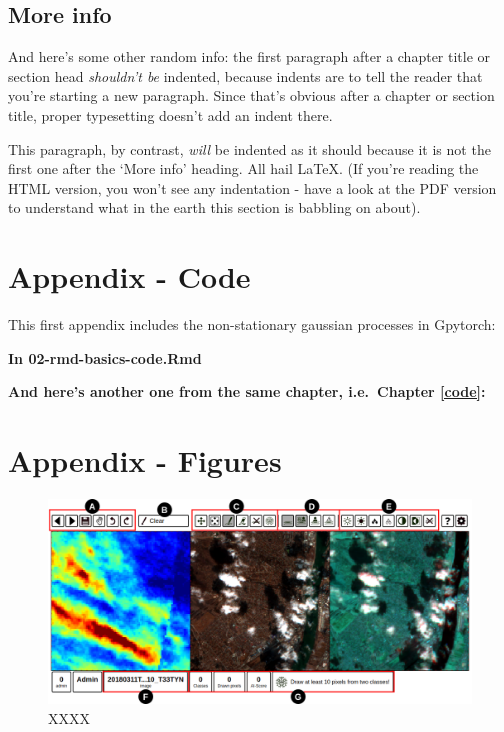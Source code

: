 \documentclass[a4paper, nobind]{templates/cdethesis}
\begin{document}
\hypertarget{more-info}{%
\section*{More info}\label{more-info}}

And here's some other random info:
the first paragraph after a chapter title or section head \emph{shouldn't be} indented, because indents are to tell the reader that you're starting a new paragraph.
Since that's obvious after a chapter or section title, proper typesetting doesn't add an indent there.

This paragraph, by contrast, \emph{will} be indented as it should because it is not the first one after the `More info' heading.
All hail LaTeX. (If you're reading the HTML version, you won't see any indentation - have a look at the PDF version to understand what in the earth this section is babbling on about).

\startappendices

\hypertarget{appendix---code}{%
\chapter{Appendix - Code}\label{appendix---code}}

This first appendix includes the non-stationary gaussian processes in Gpytorch:

\textbf{In 02-rmd-basics-code.Rmd}

\textbf{And here's another one from the same chapter, i.e.~Chapter \ref{code}:}

\hypertarget{appendix---figures}{%
\chapter{Appendix - Figures}\label{appendix---figures}}

\setcounter{figure}{0}
\makeatletter 
\renewcommand{\thefigure}{S\@arabic\c@figure}
\makeatother

\begin{figure}[!h]
    \centering
    \includegraphics[width=1\linewidth]{figures/extra/figureS2.png}
    \caption{XXXX}
    \label{fig:figureS02}
\end{figure}
\end{document}
